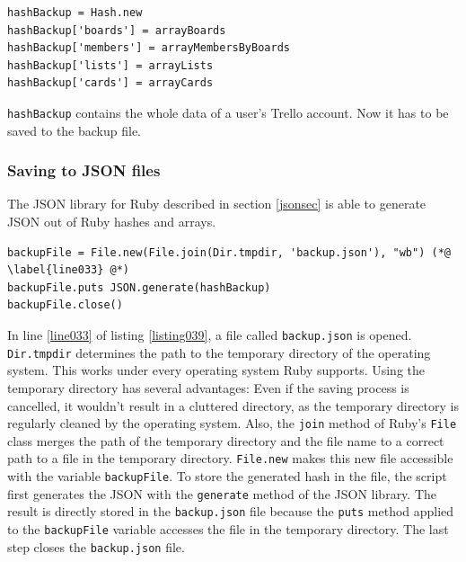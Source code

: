 \begin{lstlisting}[aboveskip=1\baselineskip, caption=\texttt{joomlaMultiple.rb} usage., label=listing038]
hashBackup = Hash.new
hashBackup['boards'] = arrayBoards
hashBackup['members'] = arrayMembersByBoards
hashBackup['lists'] = arrayLists
hashBackup['cards'] = arrayCards
\end{lstlisting}

\lstinline{hashBackup} contains the whole data of a user's Trello account. Now it has to be saved to the backup file. 

\subsubsection{Saving to JSON files}
The JSON library for Ruby described in section \ref{jsonsec} is able to generate JSON out of Ruby hashes and arrays.

\vskip 3cm

\begin{lstlisting}[aboveskip=1\baselineskip, caption=Using the temporary directory of the operating system to save the JSON to file., label=listing039]
backupFile = File.new(File.join(Dir.tmpdir, 'backup.json'), "wb") (*@ \label{line033} @*)
backupFile.puts JSON.generate(hashBackup)
backupFile.close()
\end{lstlisting}

In line \ref{line033} of listing \ref{listing039}, a file called \texttt{backup.json} is opened. \lstinline{Dir.tmpdir} determines the path to the temporary directory of the operating system. This works under every operating system Ruby supports. Using the temporary directory has several advantages: Even if the saving process is cancelled, it wouldn't result in a cluttered directory, as the temporary directory is regularly cleaned by the operating system. Also, the \lstinline{join} method of Ruby's \lstinline{File} class merges the path of the temporary directory and the file name to a correct path to a file in the temporary directory. \lstinline{File.new} makes this new file accessible with the variable \lstinline{backupFile}. To store the generated hash in the file, the script first generates the JSON with the \lstinline{generate} method of the JSON library. The result is directly stored in the \texttt{backup.json} file because the \lstinline{puts} method applied to the \lstinline{backupFile} variable accesses the file in the temporary directory. The last step closes the \texttt{backup.json} file.

